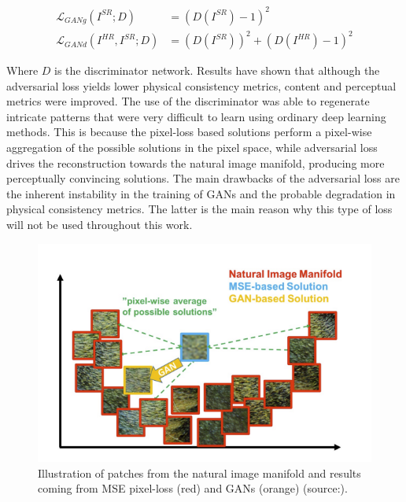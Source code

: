         \begin{equation}
            \begin{aligned}
            \mathcal{L}_{GANg}(I^{SR};D) &= (D(I^{SR}) - 1)^2 \\ 
            \mathcal{L}_{GANd}(I^{HR}, I^{SR};D) &= (D(I^{SR}))^2 + (D(I^{HR}) - 1)^2
            \end{aligned}
        \end{equation}

        Where $D$ is the discriminator network. 
        Results have shown that although the adversarial loss yields lower physical consistency metrics, content and perceptual metrics were improved. 
        The use of the discriminator was able to regenerate intricate patterns that were very difficult to learn using ordinary deep learning methods. 
        This is because the pixel-loss based solutions perform a pixel-wise aggregation of the possible solutions in the pixel space, while adversarial loss drives the reconstruction towards the natural image manifold, producing more perceptually convincing solutions. 
        The main drawbacks of the adversarial loss are the inherent instability in the training of GANs and the probable degradation in physical consistency metrics.
        The latter is the main reason why this type of loss will not be used throughout this work.

        \begin{figure}[H]
            \centering
            \includegraphics[width=\textwidth]{Includes/2-gans-natural-manifold.png}
            \caption{Illustration of patches from the natural image manifold and results coming from MSE pixel-loss (red) and GANs (orange) (source:\cite{ledig2017photorealistic}).}
            \label{fig:2-gans-natural-manifold}
        \end{figure}


